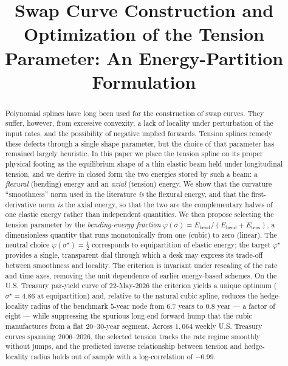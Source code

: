 \documentclass[]{interact}
\theoremstyle{plain}
\begin{document}

\title{Swap Curve Construction and Optimization of the Tension Parameter:
An Energy-Partition Formulation}

\author{
}

\maketitle

\begin{abstract}
\noindent Polynomial splines have long been used for the construction of swap curves. They
suffer, however, from excessive convexity, a lack of locality under perturbation of the
input rates, and the possibility of negative implied forwards. Tension splines remedy these
defects through a single shape parameter, but the choice of that parameter has remained
largely heuristic. In this paper we place the tension spline on its proper physical footing
as the equilibrium shape of a thin elastic beam held under longitudinal tension, and we
derive in closed form the two energies stored by such a beam: a \emph{flexural} (bending)
energy and an \emph{axial} (tension) energy. We show that the curvature ``smoothness'' norm
used in the literature \emph{is} the flexural energy, and that the first-derivative norm
\emph{is} the axial energy, so that the two are the complementary halves of one elastic
energy rather than independent quantities. We then propose selecting the tension parameter
by the \emph{bending-energy fraction}
$\varphi(\sigma)=E_{\mathrm{bend}}/(E_{\mathrm{bend}}+E_{\mathrm{tens}})$, a dimensionless
quantity that runs monotonically from one (cubic) to zero (linear). The neutral choice
$\varphi(\sigma^\star)=\tfrac12$ corresponds to equipartition of elastic energy; the target
$\varphi^\star$ provides a single, transparent dial through which a desk may express its
trade-off between smoothness and locality. The criterion is invariant under rescaling of the
rate and time axes, removing the unit dependence of earlier energy-based schemes. On the U.S.
Treasury par-yield curve of $22$-May-$2026$ the criterion yields a unique optimum
($\sigma^\star=4.86$ at equipartition) and, relative to the natural cubic spline, reduces the
hedge-locality radius of the benchmark $5$-year node from $6.7$ years to $0.8$ year --- a
factor of eight --- while suppressing the spurious long-end forward hump that the cubic
manufactures from a flat $20$--$30$-year segment. Across $1{,}064$ weekly U.S. Treasury curves
spanning 2006--2026, the selected tension tracks the rate regime smoothly without jumps, and the
predicted inverse relationship between tension and hedge-locality radius holds out of sample with
a log-correlation of $-0.99$.
\end{abstract}
\end{document}
